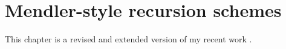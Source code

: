 \chapter{Mendler-style recursion schemes}\label{ch:mendler}

This chapter is a revised and extended version of
my recent work \cite{AhnShe11}.



















